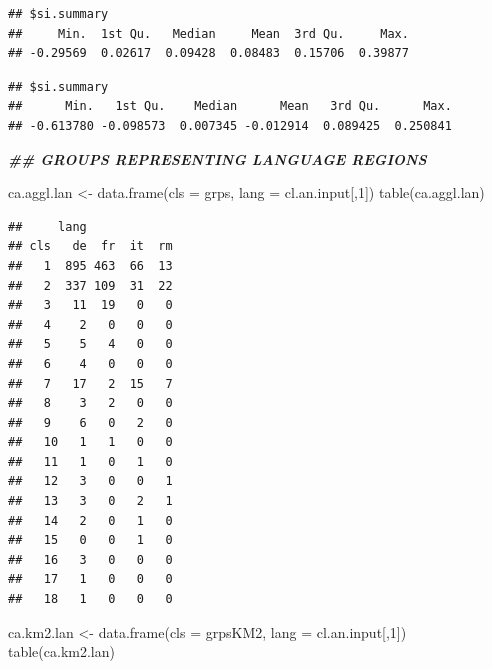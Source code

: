 \documentclass[
]{article}
\newenvironment{Shaded}{\begin{snugshade}}{\end{snugshade}}
\newcommand{\AttributeTok}[1]{\textcolor[rgb]{0.77,0.63,0.00}{#1}}
\newcommand{\DecValTok}[1]{\textcolor[rgb]{0.00,0.00,0.81}{#1}}
\newcommand{\DocumentationTok}[1]{\textcolor[rgb]{0.56,0.35,0.01}{\textbf{\textit{#1}}}}
\newcommand{\FunctionTok}[1]{\textcolor[rgb]{0.00,0.00,0.00}{#1}}
\newcommand{\NormalTok}[1]{#1}
\newcommand{\OtherTok}[1]{\textcolor[rgb]{0.56,0.35,0.01}{#1}}
\newcommand{\SpecialCharTok}[1]{\textcolor[rgb]{0.00,0.00,0.00}{#1}}
\begin{document}
\begin{verbatim}
## $si.summary
##     Min.  1st Qu.   Median     Mean  3rd Qu.     Max. 
## -0.29569  0.02617  0.09428  0.08483  0.15706  0.39877
\end{verbatim}

\begin{Shaded}
\end{Shaded}

\begin{verbatim}
## $si.summary
##      Min.   1st Qu.    Median      Mean   3rd Qu.      Max. 
## -0.613780 -0.098573  0.007345 -0.012914  0.089425  0.250841
\end{verbatim}

\begin{Shaded}
\begin{Highlighting}[]
\DocumentationTok{\#\# GROUPS REPRESENTING LANGUAGE REGIONS}

\NormalTok{ca.aggl.lan }\OtherTok{\textless{}{-}} \FunctionTok{data.frame}\NormalTok{(}\AttributeTok{cls =}\NormalTok{ grps, }\AttributeTok{lang =}\NormalTok{ cl.an.input[,}\DecValTok{1}\NormalTok{])}
\FunctionTok{table}\NormalTok{(ca.aggl.lan)}
\end{Highlighting}
\end{Shaded}

\begin{verbatim}
##     lang
## cls   de  fr  it  rm
##   1  895 463  66  13
##   2  337 109  31  22
##   3   11  19   0   0
##   4    2   0   0   0
##   5    5   4   0   0
##   6    4   0   0   0
##   7   17   2  15   7
##   8    3   2   0   0
##   9    6   0   2   0
##   10   1   1   0   0
##   11   1   0   1   0
##   12   3   0   0   1
##   13   3   0   2   1
##   14   2   0   1   0
##   15   0   0   1   0
##   16   3   0   0   0
##   17   1   0   0   0
##   18   1   0   0   0
\end{verbatim}

\begin{Shaded}
\begin{Highlighting}[]
\NormalTok{ca.km2.lan }\OtherTok{\textless{}{-}} \FunctionTok{data.frame}\NormalTok{(}\AttributeTok{cls =}\NormalTok{ grpsKM2, }\AttributeTok{lang =}\NormalTok{ cl.an.input[,}\DecValTok{1}\NormalTok{])}
\FunctionTok{table}\NormalTok{(ca.km2.lan)}
\end{Highlighting}
\end{Shaded}
\end{document}
